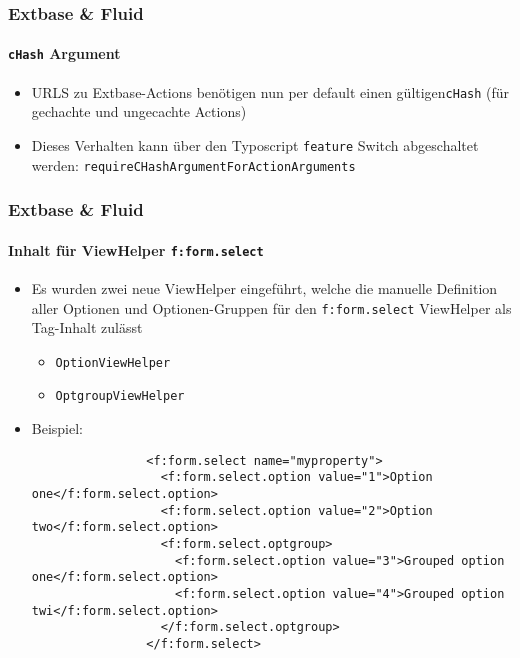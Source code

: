 \begin{frame}[fragile]
	\frametitle{Extbase \& Fluid}
	\framesubtitle{\texttt{cHash} Argument}

	\begin{itemize}
		\item URLS zu Extbase-Actions benötigen nun per default einen gültigen\texttt{cHash}\newline
			(für gechachte und ungecachte Actions)
		\item Dieses Verhalten kann über den Typoscript \texttt{feature} Switch abgeschaltet werden:
			\texttt{requireCHashArgumentForActionArguments}
	\end{itemize}

\end{frame}

\begin{frame}[fragile]
	\frametitle{Extbase \& Fluid}
	\framesubtitle{Inhalt für ViewHelper \texttt{f:form.select}}

	\lstset{basicstyle=\tiny\ttfamily}

	\begin{itemize}
		\item Es wurden zwei neue ViewHelper eingeführt, welche die manuelle Definition aller Optionen und Optionen-Gruppen für den \texttt{f:form.select} ViewHelper als Tag-Inhalt zulässt

			\begin{itemize}
				\item \texttt{OptionViewHelper}
				\item \texttt{OptgroupViewHelper}
			\end{itemize}

		\item Beispiel:

			\begin{lstlisting}
				<f:form.select name="myproperty">
				  <f:form.select.option value="1">Option one</f:form.select.option>
				  <f:form.select.option value="2">Option two</f:form.select.option>
				  <f:form.select.optgroup>
				    <f:form.select.option value="3">Grouped option one</f:form.select.option>
				    <f:form.select.option value="4">Grouped option twi</f:form.select.option>
				  </f:form.select.optgroup>
				</f:form.select>
			\end{lstlisting}

		\end{itemize}

\end{frame}


